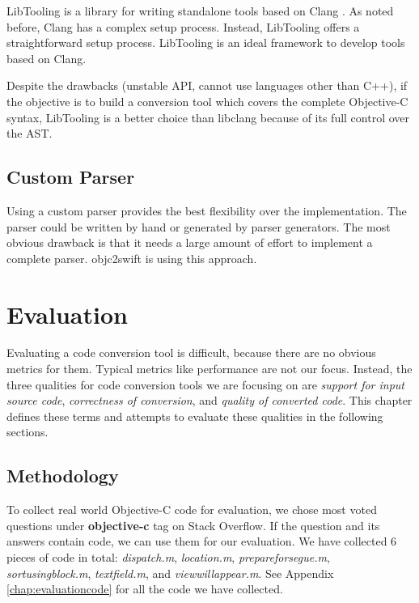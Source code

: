 \documentclass{sfuthesis}
\begin{document}
LibTooling is a library for writing standalone tools based on Clang \cite{libtooling}. As noted before, Clang has a complex setup process. Instead, LibTooling offers a straightforward setup process. LibTooling is an ideal framework to develop tools based on Clang.

Despite the drawbacks (unstable API, cannot use languages other than C++), if the objective is to build a conversion tool which covers the complete Objective-C syntax, LibTooling is a better choice than libclang because of its full control over the AST.

\section{Custom Parser}

Using a custom parser provides the best flexibility over the implementation. The parser could be written by hand or generated by parser generators. The most obvious drawback is that it needs a large amount of effort to implement a complete parser. objc2swift \cite{objc2swift} is using this approach.


\chapter{Evaluation}

Evaluating a code conversion tool is difficult, because there are no obvious metrics for them. Typical metrics like performance are not our focus. Instead, the three qualities for code conversion tools we are focusing on are \emph{support for input source code}, \emph{correctness of conversion}, and \emph{quality of converted code}. This chapter defines these terms and attempts to evaluate these qualities in the following sections.

\section{Methodology}

To collect real world Objective-C code for evaluation, we chose most voted questions under \textbf{objective-c} tag on Stack Overflow. If the question and its answers contain code, we can use them for our evaluation. We have collected 6 pieces of code in total: \emph{dispatch.m}, \emph{location.m}, \emph{prepareforsegue.m}, \emph{sortusingblock.m}, \emph{textfield.m}, and \emph{viewwillappear.m}. See Appendix \ref{chap:evaluationcode} for all the code we have collected.
\end{document}
